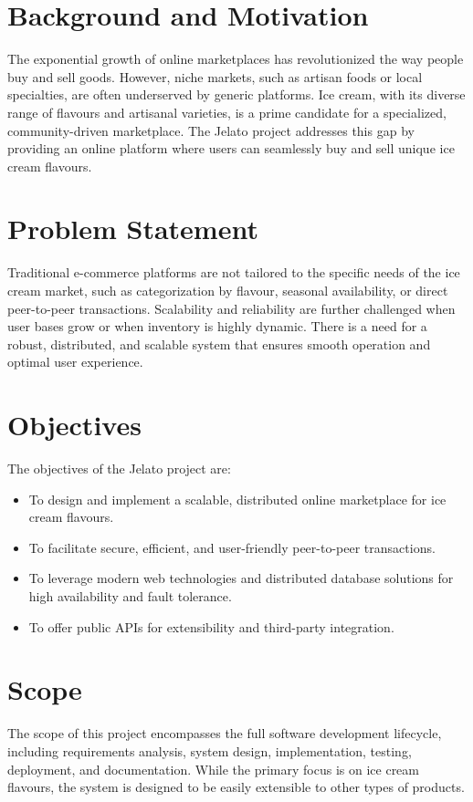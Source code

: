 \documentclass[12pt,a4paper]{report}
\begin{document}
\section{Background and Motivation}
The exponential growth of online marketplaces has revolutionized the way people buy and sell goods. However, niche markets, such as artisan foods or local specialties, are often underserved by generic platforms. Ice cream, with its diverse range of flavours and artisanal varieties, is a prime candidate for a specialized, community-driven marketplace. The Jelato project addresses this gap by providing an online platform where users can seamlessly buy and sell unique ice cream flavours.

\section{Problem Statement}
Traditional e-commerce platforms are not tailored to the specific needs of the ice cream market, such as categorization by flavour, seasonal availability, or direct peer-to-peer transactions. Scalability and reliability are further challenged when user bases grow or when inventory is highly dynamic. There is a need for a robust, distributed, and scalable system that ensures smooth operation and optimal user experience.

\section{Objectives}
The objectives of the Jelato project are:
\begin{itemize}
    \item To design and implement a scalable, distributed online marketplace for ice cream flavours.
    \item To facilitate secure, efficient, and user-friendly peer-to-peer transactions.
    \item To leverage modern web technologies and distributed database solutions for high availability and fault tolerance.
    \item To offer public APIs for extensibility and third-party integration.
\end{itemize}

\section{Scope}
The scope of this project encompasses the full software development lifecycle, including requirements analysis, system design, implementation, testing, deployment, and documentation. While the primary focus is on ice cream flavours, the system is designed to be easily extensible to other types of products.
\end{document}
